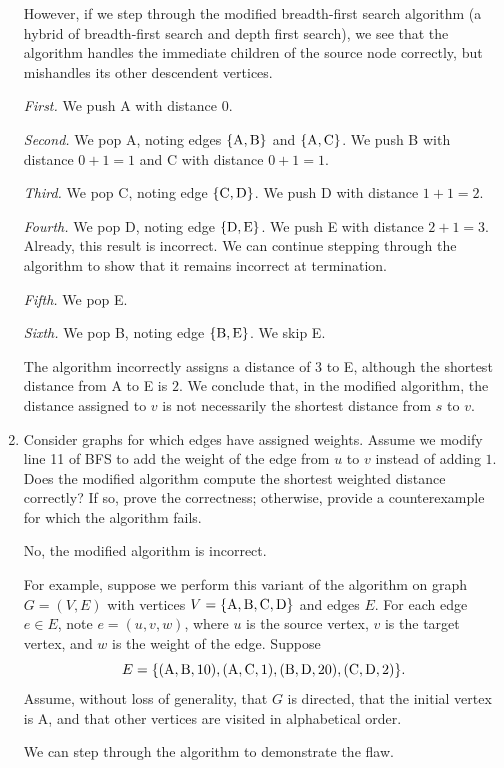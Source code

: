 \begin{enumerate}
\begin{solution}
However, if we step through the modified breadth-first search algorithm (a hybrid of breadth-first search and depth first search), we see that the algorithm handles the immediate children of the source node correctly, but mishandles its other descendent vertices.

\textit{First. }We push A with distance $0$.

\textit{Second. }We pop A, noting edges $\{{\rm A},{\rm B}\}$ and $\{{\rm A},{\rm C}\}$. We push B with distance $0+1=1$ and C with distance $0+1=1$.

\textit{Third. }We pop C, noting edge $\{{\rm C},{\rm D}\}$. We push D with distance $1+1=2$.

\textit{Fourth. }We pop D, noting edge $\{{\rm D},{\rm E}\}$. We push E with distance $2+1=3$. Already, this result is incorrect. We can continue stepping through the algorithm to show that it remains incorrect at termination.

\textit{Fifth. }We pop E.

\textit{Sixth. }We pop B, noting edge $\{{\rm B},{\rm E}\}$. We skip E.

The algorithm incorrectly assigns a distance of $3$ to E, although the shortest distance from A to E is $2$. We conclude that, in the modified algorithm, the distance assigned to $v$ is not necessarily the shortest distance from $s$ to $v$.
\end{solution}
\newpage
\item Consider graphs for which edges have assigned weights. Assume we modify line 11 of BFS to add the weight of the edge from $u$ to $v$ instead of adding $1$. Does the modified algorithm compute the shortest weighted distance correctly? If so, prove the correctness; otherwise, provide a counterexample for which the algorithm fails.
\begin{solution}
No, the modified algorithm is incorrect.

For example, suppose we perform this variant of the algorithm on graph $G=(V,E)$ with vertices $V=\{{\rm A},{\rm B},{\rm C},{\rm D}\}$ and edges $E$. For each edge $e\in E$, note $e=(u,v,w)$, where $u$ is the source vertex, $v$ is the target vertex, and $w$ is the weight of the edge. Suppose \[E=\{({\rm A},{\rm B},10),({\rm A},{\rm C},1),({\rm B},{\rm D},20),({\rm C},{\rm D},2)\}.\] Assume, without loss of generality, that $G$ is directed, that the initial vertex is A, and that other vertices are visited in alphabetical order.

We can step through the algorithm to demonstrate the flaw.


\end{solution}
\end{enumerate}
